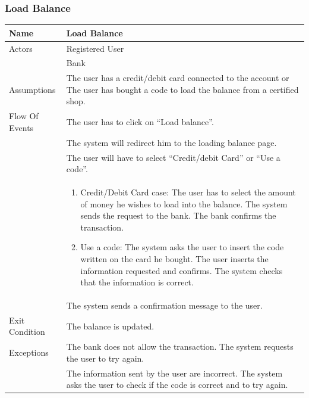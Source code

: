 \documentclass{article}
\begin{document}
\subsubsection{Load Balance}
\begin{center}
\begin{tabular}{| p{3cm} || p{8cm} |}
\hline
Name &Load Balance \\ \hline
Actors &Registered User\\&
Bank \\ \hline
Assumptions & The user has a credit/debit card connected to the account or
The user has bought a code to load the balance from a certified shop.\\ \hline
Flow Of Events &The user has to click on “Load balance”.\\&
The system will redirect him to the loading balance page.\\&
The user will have to select “Credit/debit Card” or “Use a code”.\\&
\begin{enumerate}
\item Credit/Debit Card case: The user has to select the amount of money he wishes to load into the balance.
The system sends the request to the bank.
The bank confirms the transaction.
\item Use a code:
The system asks the user to insert the code written on the card he bought.
The user inserts the information requested and confirms.
The system checks that the information is correct.
 \end{enumerate}\\& The system sends a confirmation message to the user. \\ \hline
Exit Condition & The balance is updated. \\ \hline
Exceptions & The bank does not allow the transaction. The system requests the user to try again.\\&
The information sent by the user are incorrect. The system asks the user to check if the code is correct and to try again.
\\
\hline
\end{tabular}
\end{center}
\end{document}
